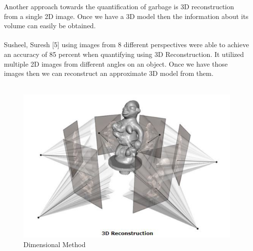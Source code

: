 Another approach towards the quantification of garbage is 3D reconstruction from a single 2D image. Once we have a 3D model then the information about its volume can easily be obtained.\\
\\
Susheel, Suresh [5] using images from 8 different perspectives were able to achieve an accuracy of 85 percent when quantifying using 3D Reconstruction. It utilized multiple 2D images from different angles on an object. Once we have those images then we can reconstruct an approximate 3D model from them.\\
\\
\begin{figure}[!hb]
   \centering
   \includegraphics[scale=0.8]{images/q4.png}
   \caption{Dimensional Method}\label{fig:picture}
\end{figure}

